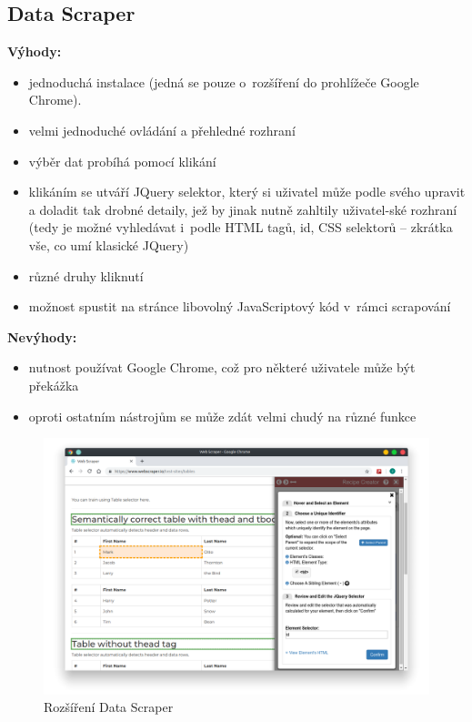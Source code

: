 \documentclass[thesis=B,czech]{FITthesis}[2012/06/26]
\begin{document}
\subsection{Data Scraper}
\textbf{Výhody:}
\begin{itemize}
	\item jednoduchá instalace (jedná se pouze o~rozšíření do prohlížeče Google Chrome).
	\item velmi jednoduché ovládání a přehledné rozhraní
	\item výběr dat probíhá pomocí klikání
	\item klikáním se utváří JQuery selektor, který si uživatel může podle svého upravit a doladit tak drobné detaily, jež by jinak nutně zahltily uživatel-ské rozhraní (tedy je možné vyhledávat i~podle HTML tagů, id, CSS selektorů -- zkrátka vše, co umí klasické JQuery)
	\item různé druhy kliknutí
	\item možnost spustit na stránce libovolný JavaScriptový kód v~rámci scrapování
\end{itemize}
\textbf{Nevýhody:}
\begin{itemize}
	\item nutnost používat Google Chrome, což pro některé uživatele může být překážka
	\item oproti ostatním nástrojům se může zdát velmi chudý na různé funkce
\end{itemize}
\begin{figure}
	\includegraphics[width=\linewidth]{images/DataScraper.png}
	\caption[Rozšíření Data Scraper]{Rozšíření Data Scraper~\cite[snímek pořídil autor]{data_scraper}}
	\label{fig:dataScraper}
\end{figure}
\end{document}
